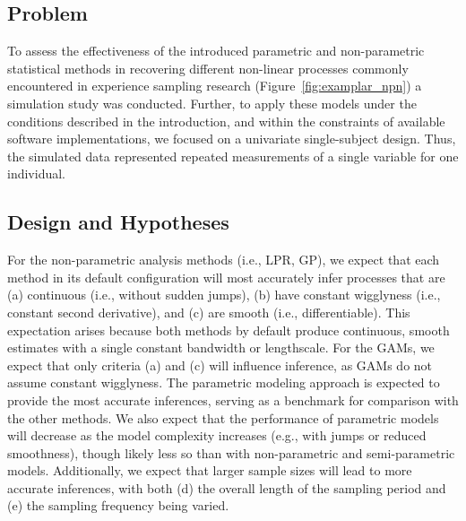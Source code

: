 \documentclass[man, floatsintext]{apa7}
\begin{document}
\subsection{Problem}

To assess the effectiveness of the introduced
parametric and non-parametric statistical methods in recovering different
non-linear processes commonly encountered in experience sampling research
(Figure~\ref{fig:examplar_npn}) a simulation study was conducted.
Further, to apply these models under the conditions described in the
introduction,
and within the constraints of available software implementations, we focused on
a univariate single-subject design. Thus, the simulated data represented
repeated measurements of a single variable for one individual.

\subsection{Design and Hypotheses}

For the non-parametric analysis methods (i.e., LPR, GP), we expect that
each method in its default configuration will most accurately infer processes
that are (a) continuous (i.e., without sudden jumps), (b) have constant
wigglyness (i.e., constant second derivative), and (c) are smooth (i.e.,
differentiable). This expectation arises because both methods by default
produce
continuous, smooth estimates with a single constant bandwidth or lengthscale.
For the GAMs, we expect that only criteria (a) and (c) will influence
inference, as GAMs do not assume constant wigglyness. The
parametric modeling approach is expected to provide the most accurate
inferences, serving as a benchmark for comparison with the other methods. We
also expect that the performance of parametric models will decrease as the
model complexity increases (e.g., with jumps or reduced smoothness), though
likely less so than with non-parametric and semi-parametric models.
Additionally, we expect that larger sample sizes will lead to more accurate
inferences, with both (d) the overall length of the sampling period and (e) the
sampling frequency being varied.
\end{document}
